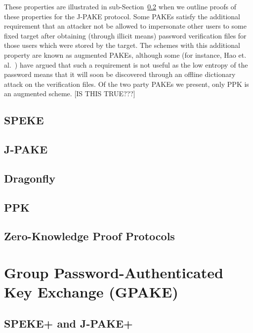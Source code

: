 \documentclass{amsart}
\newcommand{\comment}[1]{\marginpar{\color{red}{\Huge$*$}}\mbox{}{\sf\color{red}[#1]}}
\theoremstyle{remark}
\begin{document}
 These properties are illustrated in sub-Section~\ref{sec:JPAKE} when we outline proofs of these properties
 for the J-PAKE protocol. Some PAKEs satisfy the additional requirement that an attacker not be 
 allowed to impersonate other users to some fixed target after obtaining (through illicit means) password 
 verification files for those users which were stored by the target.  The schemes with this additional property 
 are known as augmented PAKEs, although some (for instance, Hao et. al.~\cite{HaYiChSh15}) have argued that 
 such a requirement is not useful as the low entropy of the password means that it will soon be discovered 
 through an offline dictionary attack on the verification files.  Of the two party PAKEs we present, only 
 PPK is an augmented scheme. \comment{IS THIS TRUE???}

\subsection{SPEKE}


\subsection{J-PAKE} 
\label{sec:JPAKE}


\subsection{Dragonfly}
\label{sec:Dragon}


\subsection{PPK}
\label{sec:PPK}


\subsection{Zero-Knowledge Proof Protocols}
\label{sec:ZKP}



\section{Group Password-Authenticated Key Exchange (GPAKE)} 
\label{sec:GPAKE}


\subsection{SPEKE+ and J-PAKE+}

\end{document}
